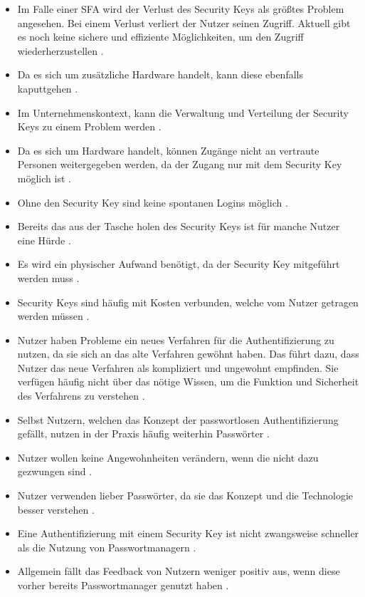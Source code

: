 \begin{itemize}
    \item Im Falle einer \ac{SFA} wird der Verlust des Security Keys als größtes Problem angesehen. Bei einem Verlust verliert der Nutzer seinen Zugriff. Aktuell gibt es noch keine sichere und effiziente Möglichkeiten, um den Zugriff wiederherzustellen \cite{lyastani2020fido2}.
    \item Da es sich um zusätzliche Hardware handelt, kann diese ebenfalls kaputtgehen \cite{farke2020you}.
    \item Im Unternehmenskontext, kann die Verwaltung und Verteilung der Security Keys zu einem Problem werden \cite{farke2020you}. 
    \item Da es sich um Hardware handelt, können Zugänge nicht an vertraute Personen weitergegeben werden, da der Zugang nur mit dem Security Key möglich ist \cite{lyastani2020fido2}.
    \item Ohne den Security Key sind keine spontanen Logins möglich \cite{lyastani2020fido2}.
    \item Bereits das aus der Tasche holen des Security Keys ist für manche Nutzer eine Hürde \cite{farke2020you}.
    \item Es wird ein physischer Aufwand benötigt, da der Security Key mitgeführt werden muss \cite{lyastani2020fido2}.
    \item Security Keys sind häufig mit Kosten verbunden, welche vom Nutzer getragen werden müssen \cite{lyastani2020fido2}.
    \item Nutzer haben Probleme ein neues Verfahren für die Authentifizierung zu nutzen, da sie sich an das alte Verfahren gewöhnt haben. Das führt dazu, dass Nutzer das neue Verfahren als kompliziert und ungewohnt empfinden. Sie verfügen häufig nicht über das nötige Wissen, um die Funktion und Sicherheit des Verfahrens zu verstehen \cite{lyastani2020fido2}.
    \item Selbst Nutzern, welchen das Konzept der passwortlosen Authentifizierung gefällt, nutzen in der Praxis häufig weiterhin Passwörter \cite{farke2020you}.
    \item Nutzer wollen keine Angewohnheiten verändern, wenn die nicht dazu gezwungen sind \cite{farke2020you}.
    \item Nutzer verwenden lieber Passwörter, da sie das Konzept und die Technologie besser verstehen \cite{lyastani2020fido2}.
    \item Eine Authentifizierung mit einem Security Key ist nicht zwangsweise schneller als die Nutzung von Passwortmanagern \cite{farke2020you}.
    \item Allgemein fällt das Feedback von Nutzern weniger positiv aus, wenn diese vorher bereits Passwortmanager genutzt haben \cite{farke2020you}.
\end{itemize}

